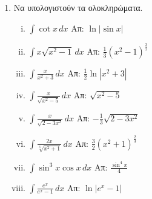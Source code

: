 \begin{enumerate}
  \item Να υπολογιστούν τα ολοκληρώματα.
    \begin{enumerate}[i)]
      \item $\int \cot x \, dx$ \hfill Απ: $\ln|\sin x|$ 
      \item $ \int x \sqrt{x^{2}-1} \,{dx} $ 
        \hfill Απ: $ \frac{1}{3} (x^{2}-1)^{\frac{3}{2}} $  
      \item $\int\frac{x}{x^2+3} \, dx$ \hfill Απ: $\frac{1}{2}\ln|x^2+3|$
      \item $\int\frac{x}{\sqrt{x^{2}-5}} \, dx$ \hfill Απ: $ \sqrt{x^{2}-5} $
      \item $\int\frac{x}{\sqrt{2-3x^{2}}} \, dx$ \hfill Απ: $ - \frac{1}{3}
      \sqrt{2-3x^{2}} $
      \item $ \int \frac{2x}{\sqrt[3]{x^{2}+1}} \,{dx} $ 
        \hfill Απ: $ \frac{3}{2} (x^{2}+1)^{\frac{2}{3}} $ 
      \item $\int \sin^3x\cos x \, dx$ \hfill Απ: $\frac{\sin^{4}x}{4}$
      \item $\int \frac{e^x}{e^x-1} \, dx$ \hfill Απ: $\ln|e^x-1|$
    \end{enumerate}
\end{enumerate}




